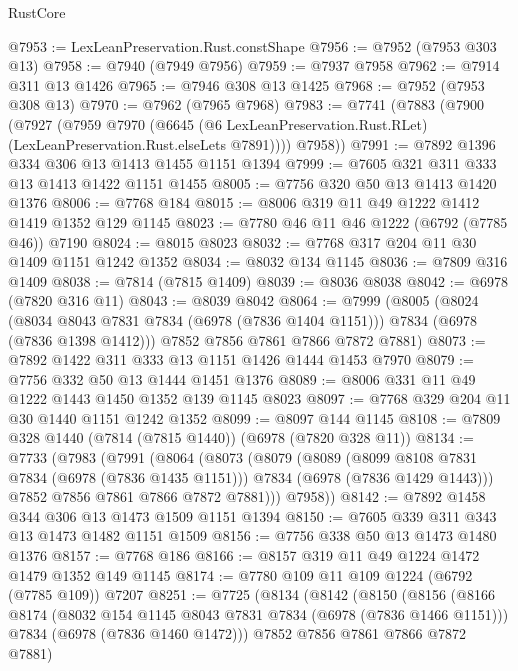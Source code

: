 \begin{lexlean}{RustCore}
\begin{coremodule}
@7953 := LexLeanPreservation.Rust.constShape
@7956 := @7952 (@7953 @303 @13)
@7958 := @7940 (@7949 @7956)
@7959 := @7937 @7958
@7962 := @7914 @311 @13 @1426
@7965 := @7946 @308 @13 @1425
@7968 := @7952 (@7953 @308 @13)
@7970 := @7962 (@7965 @7968)
@7983 := @7741
    (@7883
      (@7900
        (@7927
          (@7959
            @7970
            (@6645 (@6 LexLeanPreservation.Rust.RLet) (LexLeanPreservation.Rust.elseLets @7891))))
        @7958))
@7991 := @7892 @1396 @334 @306 @13 @1413 @1455 @1151 @1394
@7999 := @7605 @321 @311 @333 @13 @1413 @1422 @1151 @1455
@8005 := @7756 @320 @50 @13 @1413 @1420 @1376
@8006 := @7768 @184
@8015 := @8006 @319 @11 @49 @1222 @1412 @1419 @1352 @129 @1145
@8023 := @7780 @46 @11 @46 @1222 (@6792 (@7785 @46)) @7190
@8024 := @8015 @8023
@8032 := @7768 @317 @204 @11 @30 @1409 @1151 @1242 @1352
@8034 := @8032 @134 @1145
@8036 := @7809 @316 @1409
@8038 := @7814 (@7815 @1409)
@8039 := @8036 @8038
@8042 := @6978 (@7820 @316 @11)
@8043 := @8039 @8042
@8064 := @7999
    (@8005
      (@8024
        (@8034 @8043 @7831 @7834 (@6978 (@7836 @1404 @1151)))
        @7834
        (@6978 (@7836 @1398 @1412)))
      @7852
      @7856
      @7861
      @7866
      @7872
      @7881)
@8073 := @7892 @1422 @311 @333 @13 @1151 @1426 @1444 @1453 @7970
@8079 := @7756 @332 @50 @13 @1444 @1451 @1376
@8089 := @8006 @331 @11 @49 @1222 @1443 @1450 @1352 @139 @1145 @8023
@8097 := @7768 @329 @204 @11 @30 @1440 @1151 @1242 @1352
@8099 := @8097 @144 @1145
@8108 := @7809 @328 @1440 (@7814 (@7815 @1440)) (@6978 (@7820 @328 @11))
@8134 := @7733
    (@7983
      (@7991
        (@8064
          (@8073
            (@8079
              (@8089
                (@8099 @8108 @7831 @7834 (@6978 (@7836 @1435 @1151)))
                @7834
                (@6978 (@7836 @1429 @1443)))
              @7852
              @7856
              @7861
              @7866
              @7872
              @7881)))
        @7958))
@8142 := @7892 @1458 @344 @306 @13 @1473 @1509 @1151 @1394
@8150 := @7605 @339 @311 @343 @13 @1473 @1482 @1151 @1509
@8156 := @7756 @338 @50 @13 @1473 @1480 @1376
@8157 := @7768 @186
@8166 := @8157 @319 @11 @49 @1224 @1472 @1479 @1352 @149 @1145
@8174 := @7780 @109 @11 @109 @1224 (@6792 (@7785 @109)) @7207
@8251 := @7725
    (@8134
      (@8142
        (@8150
          (@8156
            (@8166
              @8174
              (@8032 @154 @1145 @8043 @7831 @7834 (@6978 (@7836 @1466 @1151)))
              @7834
              (@6978 (@7836 @1460 @1472)))
            @7852
            @7856
            @7861
            @7866
            @7872
            @7881)

\end{coremodule}
\end{lexlean}
